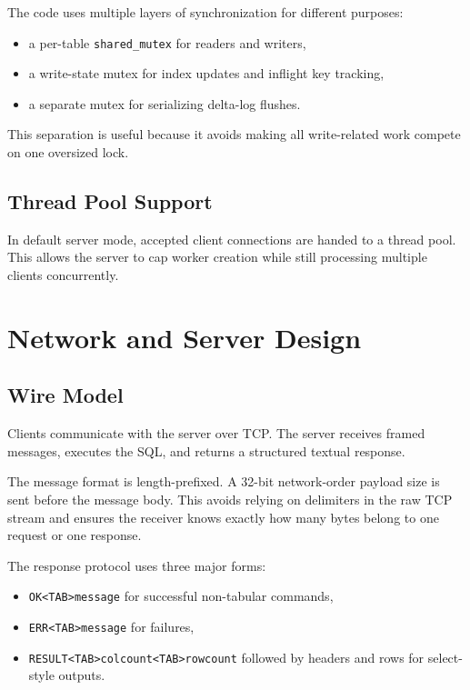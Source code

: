 \documentclass[12pt,a4paper]{article}
\begin{document}
The code uses multiple layers of synchronization for different purposes:

\begin{itemize}[leftmargin=1.8em]
  \item a per-table \texttt{shared\_mutex} for readers and writers,
  \item a write-state mutex for index updates and inflight key tracking,
  \item a separate mutex for serializing delta-log flushes.
\end{itemize}

This separation is useful because it avoids making all write-related work
compete on one oversized lock.

\subsection{Thread Pool Support}

In default server mode, accepted client connections are handed to a thread
pool. This allows the server to cap worker creation while still processing
multiple clients concurrently.

\section{Network and Server Design}

\subsection{Wire Model}

Clients communicate with the server over TCP. The server receives framed
messages, executes the SQL, and returns a structured textual response.

The message format is length-prefixed. A 32-bit network-order payload size is
sent before the message body. This avoids relying on delimiters in the raw TCP
stream and ensures the receiver knows exactly how many bytes belong to one
request or one response.

The response protocol uses three major forms:

\begin{itemize}[leftmargin=1.8em]
  \item \texttt{OK<TAB>message} for successful non-tabular commands,
  \item \texttt{ERR<TAB>message} for failures,
  \item \texttt{RESULT<TAB>colcount<TAB>rowcount} followed by headers and rows
        for select-style outputs.
\end{itemize}
\end{document}
